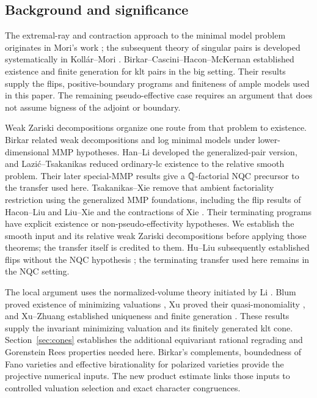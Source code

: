 \subsection{Background and significance}

The extremal-ray and contraction approach to the minimal model problem
originates in Mori's work \cite{Mori1982}; the subsequent theory of
singular pairs is developed systematically in Koll\'ar--Mori
\cite{KM98}. Birkar--Cascini--Hacon--McKernan \cite{BCHM}
established existence and finite generation for klt pairs in the big
setting. Their results supply the flips, positive-boundary programs and
finiteness of ample models used in this paper. The remaining
pseudo-effective case requires an argument that does not assume
bigness of the adjoint or boundary.

Weak Zariski decompositions organize one route from that problem to
existence. Birkar \cite{BirkarWZD} related weak decompositions and log
minimal models under lower-dimensional MMP hypotheses. Han--Li
\cite{HanLiWZD} developed the generalized-pair version, and
Lazi\'c--Tsakanikas \cite{LazicTsakanikasMM} reduced ordinary-lc
existence to the relative smooth problem. Their later special-MMP
results \cite{LazicTsakanikasSpecial} give a $\mathbb Q$-factorial NQC
precursor to the transfer used here. Tsakanikas--Xie
\cite{TsakanikasXie} remove that ambient factoriality restriction
using the generalized MMP foundations, including the flip results of
Hacon--Liu and Liu--Xie and the contractions of Xie
\cite{HaconLiu,LiuXie,XieContractions}. Their terminating programs have
explicit existence or non-pseudo-effectivity hypotheses. We establish
the smooth input and its relative weak Zariski decompositions before
applying those theorems; the transfer itself is credited to them.
Hu--Liu subsequently established flips without the NQC hypothesis
\cite[Theorems~1.1--1.2]{HuLiuNonNQC}; the terminating transfer used here
remains in the NQC setting.

The local argument uses the normalized-volume theory initiated by Li
\cite{LiMinimizing}. Blum proved existence of minimizing valuations
\cite[Main Theorem and Section~7]{BlumExistence}, Xu proved their
quasi-monomiality \cite[Theorem~1.2]{XuQuasiMonomial}, and Xu--Zhuang
established uniqueness and finite generation
\cite{MinimizerUniqueness,StableDegeneration}. These results supply
the invariant minimizing valuation and its finitely generated
klt cone. Section~\ref{sec:cones} establishes the additional equivariant
rational regrading and Gorenstein Rees properties needed here.
Birkar's complements, boundedness of Fano varieties and effective
birationality for polarized varieties
\cite{BirkarComplements,BAB,BirkarPolarised} provide the projective
numerical inputs. The new product estimate links those inputs to
controlled valuation selection and exact character congruences.

